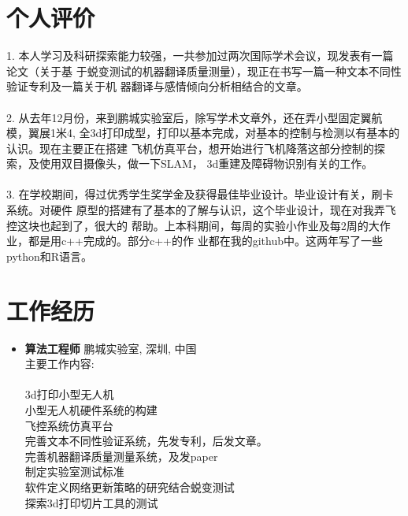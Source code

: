 \documentclass[]{friggeri-cv}
\renewenvironment{entrylist}{%
  \begin{itemize}[leftmargin=1in]%
  }{%
  \end{itemize}
}
\renewcommand{\entry}[4]{%
\item[#1]
  \textbf{#2}%
  \hfill%
  {\footnotesize\addfontfeature{Color=myblue} #3}\\%
  #4\vspace{\parsep}%
}
\begin{document}
\section{个人评价}
1. 本人学习及科研探索能力较强，一共参加过两次国际学术会议，现发表有一篇论文（关于基
于蜕变测试的机器翻译质量测量），现正在书写一篇一种文本不同性验证专利及一篇关于机
器翻译与感情倾向分析相结合的文章。\\\\
2. 从去年12月份，来到鹏城实验室后，除写学术文章外，还在弄小型固定翼航模，翼展1米4,
全3d打印成型，打印以基本完成，对基本的控制与检测以有基本的认识。现在主要正在搭建
飞机仿真平台，想开始进行飞机降落这部分控制的探索，及使用双目摄像头，做一下SLAM，
3d重建及障碍物识别有关的工作。\\\\
3. 在学校期间，得过优秀学生奖学金及获得最佳毕业设计。毕业设计有关，刷卡系统。对硬件
原型的搭建有了基本的了解与认识，这个毕业设计，现在对我弄飞控这块也起到了，很大的
帮助。上本科期间，每周的实验小作业及每2周的大作业，都是用c++完成的。部分c++的作
业都在我的github中。这两年写了一些python和R语言。

\section{工作经历}
\begin{entrylist}
  \entry
  {2018.12 至今\\}
  {\large{算法工程师}}
  {鹏城实验室, 深圳, 中国}
  {主要工作内容:\\\\
    3d打印小型无人机\\
    小型无人机硬件系统的构建\\
    飞控系统仿真平台\\
    完善文本不同性验证系统，先发专利，后发文章。\\
    完善机器翻译质量测量系统，及发paper\\
    制定实验室测试标准\\
    软件定义网络更新策略的研究结合蜕变测试\\
    探索3d打印切片工具的测试\\
}
\end{entrylist}
\end{document}
